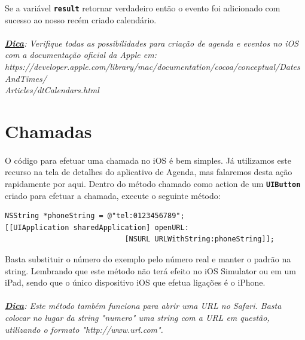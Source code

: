 \documentclass[a4paper,12pt,brazil,doubleside]{book}
\begin{document}
Se a variável \texttt{\textbf{result}} retornar verdadeiro então o evento foi adicionado com sucesso ao nosso recém criado calendário.

\paragraph{}\textit{\textbf{\underline{Dica}}: Verifique todas as possibilidades para criação de agenda e eventos no iOS com a documentação oficial da Apple em:\\ https://developer.apple.com/library/mac/documentation/cocoa/conceptual/DatesAndTimes/\\Articles/dtCalendars.html}

\bigskip


\section{Chamadas}

\paragraph{}O código para efetuar uma chamada no iOS é bem simples. Já utilizamos este recurso na tela de detalhes do aplicativo de Agenda, mas falaremos desta ação rapidamente por aqui.
Dentro do método chamado como action de um \texttt{\textbf{UIButton}} criado para efetuar a chamada, execute o seguinte método:

\begin{listing}
\begin{verbatim}
NSString *phoneString = @"tel:0123456789";
[[UIApplication sharedApplication] openURL:
                            [NSURL URLWithString:phoneString]];
\end{verbatim}
\end{listing}

Basta substituir o número do exemplo pelo número real e manter o padrão na string. Lembrando que este método não terá efeito no iOS Simulator ou em um iPad, sendo que o único dispositivo iOS que efetua ligações é o iPhone.

\paragraph{}\textit{\textbf{\underline{Dica}}: Este método também funciona para abrir uma URL no Safari. Basta colocar no lugar da string "numero" uma string com a URL em questão, utilizando o formato "http://www.url.com".}
\end{document}
